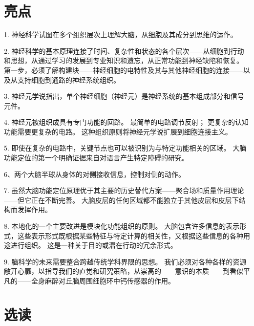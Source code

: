 \section{亮点}

1. 神经科学试图在多个组织层次上理解大脑，从细胞及其成分到思维的运作。

2. 神经科学的基本原理连接了时间、复杂性和状态的各个层次——从细胞到行动和思想，从通过学习的发展到专业知识和遗忘，从正常功能到神经缺陷和恢复。 
第一步，必须了解构建块——神经细胞的电特性及其与其他神经细胞的连接——以及从支持细胞到通路的神经系统组织。


3. 神经元学说指出，单个神经细胞（神经元）是神经系统的基本组成部分和信号元件。

4. 神经元被组织成具有专门功能的回路。 
最简单的电路调节反射； 更复杂的认知功能需要更复杂的电路。 
这种组织原则将神经元学说扩展到细胞连接主义。


5. 即使在复杂的电路中，关键节点也可以被识别为与特定功能相关的区域。 
大脑功能定位的第一个明确证据来自对语言产生特定障碍的研究。


6、两个大脑半球从身体的对侧接收信息，控制对侧的动作。

7. 虽然大脑功能定位原理优于其主要的历史替代方案——聚合场和质量作用理论——但它正在不断完善。 
大脑皮层的任何区域都不能独立于其他皮层和皮层下结构而发挥作用。

8. 本地化的一个主要改进是模块化功能组织的原则。 大脑包含许多信息的表示形式，这些表示形式既根据某些特征与特定计算的相关性，又根据这些信息的各种用途进行组织。 
这是一种关于目的或潜在行动的冗余形式。


9. 脑科学的未来需要整合跨越传统学科界限的思想。 
我们必须对各种各样的资源敞开心扉，以指导我们的直觉和研究策略，从崇高的——意识的本质——到看似平凡的——全身麻醉对丘脑周围细胞环中钙传感器的作用。


\section{选读}

